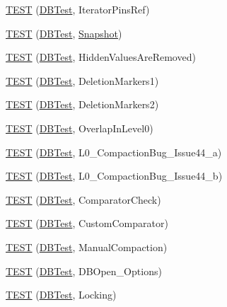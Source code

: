 \begin{DoxyCompactItemize}
\item 
\hyperlink{namespaceleveldb_a899f7415195fa4d25d801246cdec721d}{T\-E\-S\-T} (\hyperlink{classleveldb_1_1_d_b_test}{D\-B\-Test}, Iterator\-Pins\-Ref)
\item 
\hyperlink{namespaceleveldb_ab09998970d1ace06b8082f49da0444f5}{T\-E\-S\-T} (\hyperlink{classleveldb_1_1_d_b_test}{D\-B\-Test}, \hyperlink{classleveldb_1_1_snapshot}{Snapshot})
\item 
\hyperlink{namespaceleveldb_a94214aebbf6328e7ad9ba735c5e42f68}{T\-E\-S\-T} (\hyperlink{classleveldb_1_1_d_b_test}{D\-B\-Test}, Hidden\-Values\-Are\-Removed)
\item 
\hyperlink{namespaceleveldb_a216168df3713bb71f35038d91b5224f0}{T\-E\-S\-T} (\hyperlink{classleveldb_1_1_d_b_test}{D\-B\-Test}, Deletion\-Markers1)
\item 
\hyperlink{namespaceleveldb_a4188787b0b1e1e25475a2983374065b6}{T\-E\-S\-T} (\hyperlink{classleveldb_1_1_d_b_test}{D\-B\-Test}, Deletion\-Markers2)
\item 
\hyperlink{namespaceleveldb_a4fa4ffaab998ba44a1745937c1e9c55c}{T\-E\-S\-T} (\hyperlink{classleveldb_1_1_d_b_test}{D\-B\-Test}, Overlap\-In\-Level0)
\item 
\hyperlink{namespaceleveldb_a46665ff2f4f9bd25167f82d3be16f8b2}{T\-E\-S\-T} (\hyperlink{classleveldb_1_1_d_b_test}{D\-B\-Test}, L0\-\_\-\-Compaction\-Bug\-\_\-\-Issue44\-\_\-a)
\item 
\hyperlink{namespaceleveldb_a727df67090c63a0ca4b2effdc90a3da1}{T\-E\-S\-T} (\hyperlink{classleveldb_1_1_d_b_test}{D\-B\-Test}, L0\-\_\-\-Compaction\-Bug\-\_\-\-Issue44\-\_\-b)
\item 
\hyperlink{namespaceleveldb_a5cd6c2754610c66f4dd998874482c80b}{T\-E\-S\-T} (\hyperlink{classleveldb_1_1_d_b_test}{D\-B\-Test}, Comparator\-Check)
\item 
\hyperlink{namespaceleveldb_a38772a8b86ea7658430b1fa2f1a5d83e}{T\-E\-S\-T} (\hyperlink{classleveldb_1_1_d_b_test}{D\-B\-Test}, Custom\-Comparator)
\item 
\hyperlink{namespaceleveldb_a34a511836c47efe81202280115290934}{T\-E\-S\-T} (\hyperlink{classleveldb_1_1_d_b_test}{D\-B\-Test}, Manual\-Compaction)
\item 
\hyperlink{namespaceleveldb_a88d6fdcb16ed4edc65da40f383e6f23b}{T\-E\-S\-T} (\hyperlink{classleveldb_1_1_d_b_test}{D\-B\-Test}, D\-B\-Open\-\_\-\-Options)
\item 
\hyperlink{namespaceleveldb_a8470163c7e8b292085a5b60f989dc828}{T\-E\-S\-T} (\hyperlink{classleveldb_1_1_d_b_test}{D\-B\-Test}, Locking)

\end{DoxyCompactItemize}
